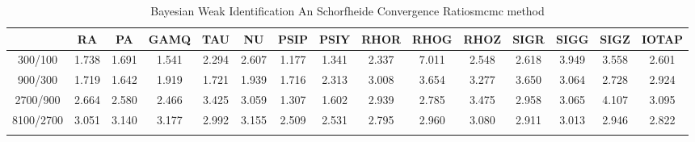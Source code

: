\documentclass[a4paper,10pt]{article}
\begin{document}
\centering
\begin{longtable}{ccccccccccccccc}
\toprule
 & RA & PA & GAMQ & TAU & NU & PSIP & PSIY & RHOR & RHOG & RHOZ & SIGR & SIGG & SIGZ & IOTAP \\
\midrule
300/100 & 1.738 & 1.691 & 1.541 & 2.294 & 2.607 & 1.177 & 1.341 & 2.337 & 7.011 & 2.548 & 2.618 & 3.949 & 3.558 & 2.601 \\
900/300 & 1.719 & 1.642 & 1.919 & 1.721 & 1.939 & 1.716 & 2.313 & 3.008 & 3.654 & 3.277 & 3.650 & 3.064 & 2.728 & 2.924 \\
2700/900 & 2.664 & 2.580 & 2.466 & 3.425 & 3.059 & 1.307 & 1.602 & 2.939 & 2.785 & 3.475 & 2.958 & 3.065 & 4.107 & 3.095 \\
8100/2700 & 3.051 & 3.140 & 3.177 & 2.992 & 3.155 & 2.509 & 2.531 & 2.795 & 2.960 & 3.080 & 2.911 & 3.013 & 2.946 & 2.822 \\
\bottomrule
\caption{Bayesian Weak Identification An Schorfheide Convergence Ratiosmcmc method}
\label{table:tbl:WeakAnSchoConvergenceRatios_mcmc}
\end{longtable}
\end{document}
